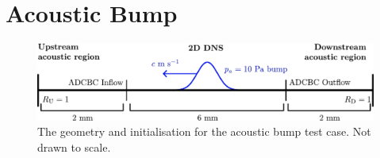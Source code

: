 \section{Acoustic Bump}

\begin{figure}[t]
\centering
\includegraphics[scale=0.65]{assets/imgs/adcbc_bump_test.pdf}
\caption{The geometry and initialisation for the acoustic bump test case. Not drawn to scale.}
\label{fig:ac-bump-test}
\end{figure}

